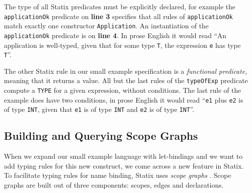       The type of all Statix predicates must be explicitly declared, for example the \texttt{applicationOk} predicate on \textbf{line 3} specifies that all rules of \texttt{applicationOk} match exactly one constructor \texttt{Application}. An instantiation of the \texttt{applicationOk} predicate is on \textbf{line 4}. In prose English it would read ``An application is well-typed, given that for some type \texttt{T}, the expression \texttt{e} has type \texttt{T}''.
      
      The other Statix rule in our small example specification is a \textit{functional predicate}, meaning that it returns a value. All but the last rules of the \texttt{typeOfExp} predicate compute a \texttt{TYPE} for a given expression, without conditions. The last rule of the example does have two conditions, in prose English it would read ``\texttt{e1} plus \texttt{e2} is of type \texttt{INT}, given that \texttt{e1} is of type \texttt{INT} and \texttt{e2} is of type \texttt{INT}''.

    \subsection{\label{subsec:building-and-querying-scope-graphs}Building and Querying Scope Graphs}

      When we expand our small example language with let-bindings and we want to add typing rules for this new construct, we come across a new feature in Statix. To facilitate typing rules for name binding, Statix uses \textit{scope graphs} \autocite{Neron2015}. Scope graphs are built out of three components: scopes, edges and declarations.

